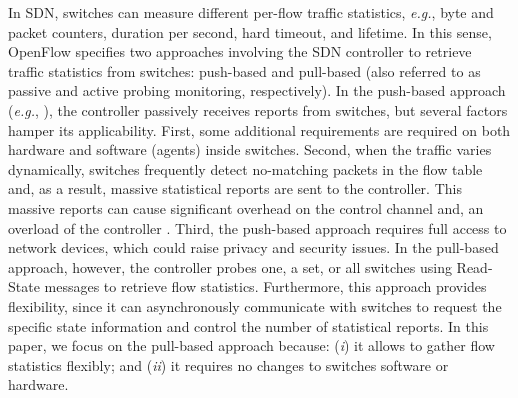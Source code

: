 In SDN, switches can measure different per-flow traffic statistics, \textit{e.g.}, byte and packet counters, duration per second, hard timeout, and lifetime. In this sense, OpenFlow \cite{onf_2012:openflow} specifies two approaches involving the SDN controller to retrieve traffic statistics from switches: push-based and pull-based (also referred to as passive and active probing monitoring, respectively). In the push-based approach (\textit{e.g.}, \cite{claise2004:cisco_netflow,phaal2001:inmon_sflow}), the controller passively receives reports from switches, but several factors hamper its applicability. First, some additional requirements are required on both hardware and software (agents) inside switches. Second, when the traffic varies dynamically, switches frequently detect no-matching packets in the flow table and, as a result, massive statistical reports are sent to the controller. This massive reports can cause significant overhead on the control channel \cite{aslan_2016:impact} and, an overload of the controller \cite{su_2014:flowcover}. Third, the push-based approach requires full access to network devices, which could raise privacy and security issues. In the pull-based approach, however, the controller probes one, a set, or all switches using Read-State messages to retrieve flow statistics. Furthermore, this approach provides flexibility, since it can asynchronously communicate with switches to request the specific state information and control the number of statistical reports. In this paper, we focus on the pull-based approach because: (\textit{i}) it allows to gather flow statistics flexibly; and (\textit{ii}) it requires no changes to switches software or hardware. %

